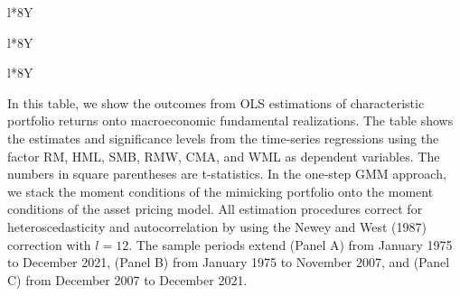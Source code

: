 \documentclass[11pt,halfline,a4paper]{ouparticle}
\begin{document}
\newpage

\begin{table}[htb!]
  \caption{Macroeconomic risk exposures}
  \label{tbl:macroexp}
  \begin{tabularx}{\linewidth}{l*{8}{Y}}
    \toprule
     \\
    \midrule
  
   
  \end{tabularx}

\begin{tabularx}{\linewidth}{l*{8}{Y}}
    \toprule
     \\
    \midrule
         
  \end{tabularx}
  \end{table}
    \clearpage
\begin{table}\ContinuedFloat
  
  \begin{tabularx}{\linewidth}{l*{8}{Y}}
    \toprule
     \\
    \midrule
         
        \cr
    \bottomrule 
  \end{tabularx}
  In this table, we show the outcomes from OLS estimations of characteristic portfolio returns onto macroeconomic fundamental realizations. The table shows the estimates and significance levels from the time-series regressions using the factor RM, HML, SMB, RMW, CMA, and WML as dependent variables. The numbers in square parentheses are t-statistics. In the one-step GMM approach, we stack the moment conditions of the mimicking portfolio onto the moment conditions of the asset pricing model. All estimation procedures correct for heteroscedasticity and autocorrelation by using the Newey and West (1987) correction with $l = 12$. The sample periods extend (Panel A) from January 1975 to December 2021, (Panel B) from January 1975 to November 2007, and (Panel C) from December 2007 to December 2021. 
\end{table}
\end{document}
